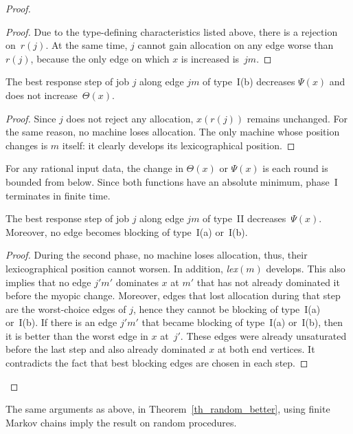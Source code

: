 \documentclass{llncs}
\newcommand{\lex}{{\slshape lex}}
\begin{document}
\begin{proof}
	\begin{proof}
		Due to the type-defining characteristics listed above, there is a rejection on~$r(j)$. At the same time, $j$ cannot gain allocation on any edge worse than $r(j)$, because the only edge on which $x$ is increased is~$jm$. 
	\end{proof}
	
	\begin{claim}
		The best response step of job $j$ along edge $jm$ of type~I(b) decreases $\Psi(x)$ and does not increase~$\Theta(x)$.
	\end{claim}
	
	\begin{proof}
		 Since $j$ does not reject any allocation, $x(r(j))$ remains unchanged. For the same reason, no machine loses allocation. The only machine whose position changes is $m$ itself: it clearly develops its lexicographical position.
	\end{proof}
	
	For any rational input data, the change in $\Theta(x)$ or $\Psi(x)$ is each round is bounded from below. Since both functions have an absolute minimum, phase~I terminates in finite time.
	
	\begin{claim}
		The best response step of job $j$ along edge $jm$ of type~II decreases~$\Psi(x)$. Moreover, no edge becomes blocking of type~I(a) or~I(b).
	\end{claim}
	
	\begin{proof}
		 During the second phase, no machine loses allocation, thus, their lexicographical position cannot worsen. In addition, \lex$(m)$ develops. This also implies that no edge $j'm'$ dominates $x$ at $m'$ that has not already dominated it before the myopic change. Moreover, edges that lost allocation during that step are the worst-choice edges of $j$, hence they cannot be blocking of type~I(a) or~I(b). If there is an edge $j'm'$ that became blocking of type~I(a) or~I(b), then it is better than the worst edge in $x$ at~$j'$. These edges were already unsaturated before the last step and also already dominated $x$ at both end vertices. It contradicts the fact that best blocking edges are chosen in each step.
	\end{proof}
\end{proof}

The same arguments as above, in Theorem~\ref{th_random_better}, using finite Markov chains imply the result on random procedures.
\end{document}
